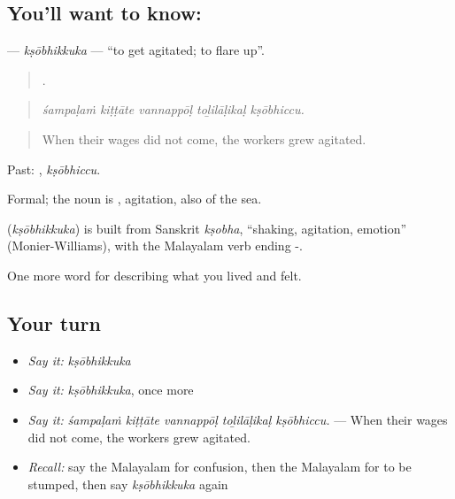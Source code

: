 \subsection*{You'll want to know: }
\textbf{} — \emph{kṣōbhikkuka} — \textquotedblleft{}to get agitated; to flare up\textquotedblright{}.

\begin{quote}
    .
\end{quote}

\begin{quote}
\emph{śampaḷaṁ kiṭṭāte vannappōḷ toḻilāḷikaḷ kṣōbhiccu.}
\end{quote}

\begin{quote}
When their wages did not come, the workers grew agitated.
\end{quote}

Past: , \emph{kṣōbhiccu}.

Formal; the noun is , agitation, also of the sea.

\begin{cousinweb}
\textbf{} (\emph{kṣōbhikkuka}) is built from Sanskrit \emph{kṣobha}, \textquotedblleft{}shaking, agitation, emotion\textquotedblright{} (Monier-Williams), with the Malayalam verb ending -.
\end{cousinweb}

\begin{grammarlens}[title={What you've built}]
One more word for describing what you lived and felt.
\end{grammarlens}

\subsection*{Your turn}
\begin{itemize}
\raggedright
  \item \emph{Say it:} \emph{kṣōbhikkuka}
  \item \emph{Say it:} \emph{kṣōbhikkuka}, once more
  \item \emph{Say it:} \emph{śampaḷaṁ kiṭṭāte vannappōḷ toḻilāḷikaḷ kṣōbhiccu.} — When their wages did not come, the workers grew agitated.
  \item \emph{Recall:} say the Malayalam for confusion, then the Malayalam for to be stumped, then say \emph{kṣōbhikkuka} again
\end{itemize}

